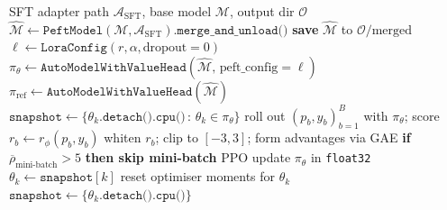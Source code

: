 \documentclass[10pt,twocolumn,letterpaper]{article}
\begin{document}
\begin{algorithm}[t]
\caption{Merge-and-Reinitialise for PEFT--PPO}
\label{alg:merge}
\begin{algorithmic}[1]
  \REQUIRE SFT adapter path $\mathcal{A}_{\text{SFT}}$, base model $\mathcal{M}$, output dir $\mathcal{O}$
  \STATE $\hat{\mathcal{M}} \leftarrow \texttt{PeftModel}(\mathcal{M}, \mathcal{A}_{\text{SFT}})\texttt{.merge\_and\_unload()}$ \hfill{}
  \STATE \textbf{save} $\hat{\mathcal{M}}$ to $\mathcal{O}/\text{merged}$
  \STATE $\ell \leftarrow \texttt{LoraConfig}(r,\alpha,\text{dropout}{=}0)$ \hfill{}
  \STATE $\pi_\theta \leftarrow \texttt{AutoModelWithValueHead}(\hat{\mathcal{M}},\,\text{peft\_config}{=}\ell)$
  \STATE $\pi_{\text{ref}} \leftarrow \texttt{AutoModelWithValueHead}(\hat{\mathcal{M}})$ \hfill{}
  \STATE $\texttt{snapshot} \leftarrow \{\theta_k.\texttt{detach()}.\texttt{cpu()}\,:\,\theta_k\in\pi_\theta\}$
    \STATE roll out $(p_b, y_b)_{b=1}^{B}$ with $\pi_\theta$; score $r_b\!\leftarrow\!r_\phi(p_b,y_b)$
    \STATE whiten $r_b$; clip to $[-3,3]$; form advantages via GAE
    \STATE \textbf{if} $\overline{\rho}_{\text{mini-batch}} > 5$ \textbf{then skip mini-batch}
    \STATE PPO update $\pi_\theta$ in \texttt{float32}
      \STATE $\theta_k \leftarrow \texttt{snapshot}[k]$ \hfill{}
      \STATE reset optimiser moments for $\theta_k$
    \ELSE
      \STATE $\texttt{snapshot}\leftarrow\{\theta_k.\texttt{detach()}.\texttt{cpu()}\}$
    \ENDIF
  \ENDFOR
\end{algorithmic}
\end{algorithm}
\end{document}
